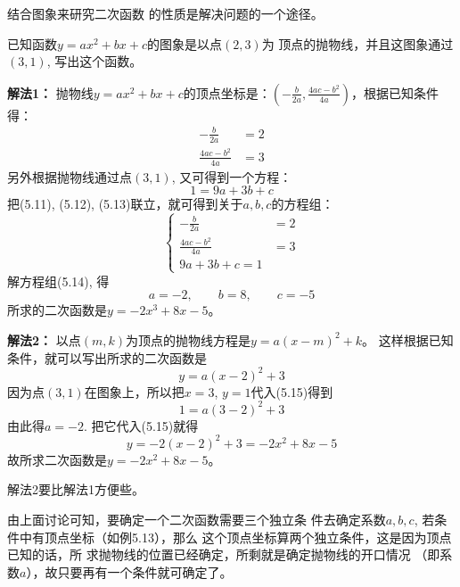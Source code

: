 结合图象来研究二次函数
的性质是解决问题的一个途径。

\begin{example}
    已知函数$y=ax^2+bx+c$的图象是以点$(2,3)$为
顶点的抛物线，并且这图象通过$(3,1)$, 写出这个函数。
\end{example}

\begin{solution}
\textbf{解法1：} 抛物线$y=ax^2+bx+c$的顶点坐标是：$\left(-\frac{b}{2a},\frac{4ac-b^2}{4a}\right)$，根据已知条件得：
\begin{align}
    -\frac{b}{2a}&=2\\
\frac{4ac-b^2}{4a}&=3
\end{align}
另外根据抛物线通过点$(3,1)$, 又可得到一个方程：
\begin{equation}
    1=9a+3b+c
\end{equation}
把(5.11), (5.12), (5.13)联立，就可得到关于$a,b,c$的方程组：
\begin{equation}
    \begin{cases}
        -\frac{b}{2a}&=2\\
\frac{4ac-b^2}{4a}&=3\\
9a+3b+c=1
    \end{cases}
\end{equation}
解方程组(5.14), 得
\[a=-2,\qquad b=8,\qquad c=-5\]
所求的二次函数是$y=-2x^3+8x-5$。

\textbf{解法2：} 以点$(m,k)$为顶点的抛物线方程是$y=a(x-m)^2+k$。
这样根据已知条件，就可以写出所求的二次函数是
\begin{equation}
    y=a(x-2)^2+3
\end{equation}
因为点$(3,1)$在图象上，所以把$x=3$, $y=1$代入(5.15)得到
\[1=a(3-2)^2+3\]
由此得$a=-2$. 把它代入(5.15)就得
\[y=-2(x-2)^2+3=-2x^2+8x-5\]
故所求二次函数是$y=-2x^2+8x-5$。

解法2要比解法1方便些。
\end{solution}

由上面讨论可知，要确定一个二次函数需要三个独立条
件去确定系数$a,b,c$, 若条件中有顶点坐标（如例5.13），那么
这个顶点坐标算两个独立条件，这是因为顶点已知的话，所
求抛物线的位置已经确定，所剩就是确定抛物线的开口情况
（即系数$a$），故只要再有一个条件就可确定了。

